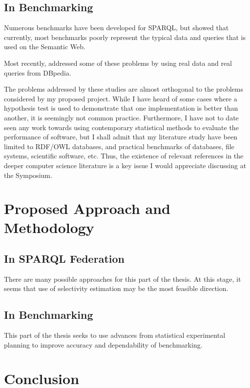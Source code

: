 \documentclass{llncs}
\begin{document}
\subsection{In Benchmarking}

Numerous benchmarks have been developed for SPARQL, but
\cite{Duan:2011:AOC:1989323.1989340} showed that currently, most
benchmarks poorly represent the typical data and queries that is used
on the Semantic Web.

Most recently, \cite{mxro:Morsey2011DBpedia} addressed some of these
problems by using real data and real queries from DBpedia.

The problems addressed by these studies are almost orthogonal to the
problems considered by my proposed project. While I have heard of some
cases where a hypothesis test is used to demonstrate that one
implementation is better than another, it is seemingly not common
practice. Furthermore, I have not to date seen any work towards using
contemporary statistical methods to evaluate the performance of
software, but I shall admit that my literature study have been limited
to RDF/OWL databases, and practical benchmarks of databases, file
systems, scientific software, etc. Thus, the existence of relevant
references in the deeper computer science literature is a key issue I
would appreciate discussing at the Symposium.


\section{Proposed Approach and Methodology}

\subsection{In SPARQL Federation}

There are many possible approaches for this part of the thesis. At
this stage, it seems that use of selectivity estimation may be the
most feasible direction.

\subsection{In Benchmarking}

This part of the thesis seeks to use advances from statistical
experimental planning to improve accuracy and dependability of benchmarking.

\section{Conclusion}
\end{document}
